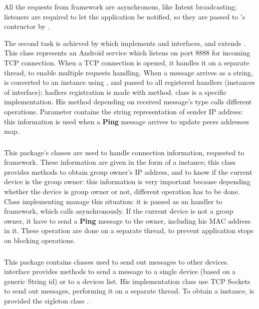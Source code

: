 All the requests from \direct framework are asynchronous, like Intent broadcasting; listeners are required to let the application be notified, so they are passed to 's contructor by .
	
	The second task is achieved by  which implements  and  interfaces, and extends . This class represents an Android service which listens on port 8888 for incoming TCP connection. When a TCP connection is opened, it handles it on a separate thread, to enable multiple requests handling. When a message arrives as a string, is converted to an  instance using , and passed to all registered handlers (instances of  interface); hadlers registration is made with  method.
	 class is a specific  implementation. His method  depending on received message's type calls different  operations. Parameter  contains the string representation of sender IP address: this information is used when a \textbf{Ping} message arrives to update peers addresses map.
	\\
	\subsubsection{}
	This package's classes are used to handle connection information, requested to \direct framework. These information are given in the form of a  instance; this class provides methods to obtain group owner's IP address, and to know if the current device is the group owner: this information is very important because depending whether the device is group owner or not, different operation has to be done. Class  implementing  manage this situation: it is passed as an handler to \direct framework, which calls  asynchronously. 
	If the current device is not a group owner, it have to send a \textbf{Ping} message to the owner, including his MAC address in it.
	These operation are done on a separate thread, to prevent application stops on blocking operations.
	\\
	\subsubsection{}
	This package contains classes used to send out messages to other devices.  interface provides methods to send a message to a single device (based on a generic String id) or to a devices list. His implementation class  use TCP Sockets to send out messages, performing it on a separate thread. To obtain a  instance, is provided the sigleton class .

